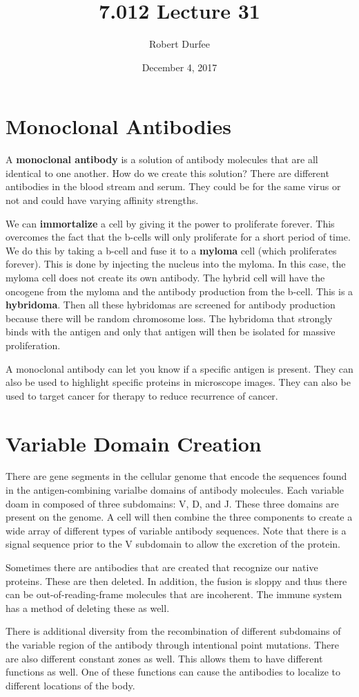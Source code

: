 \documentclass{article}
\title{ 7.012 Lecture 31 }
\author{ Robert Durfee }
\date{ December 4, 2017 }
\begin{document}
\maketitle

\section{ Monoclonal Antibodies }

A \textbf{monoclonal antibody} is a solution of antibody molecules that are all
identical to one another. How do we create this solution? There are different
antibodies in the blood stream and serum. They could be for the same virus or
not and could have varying affinity strengths.

We can \textbf{immortalize} a cell by giving it the power to proliferate
forever. This overcomes the fact that the b-cells will only proliferate for a
short period of time. We do this by taking a b-cell and fuse it to a
\textbf{myloma} cell (which proliferates forever). This is done by injecting the
nucleus into the myloma. In this case, the myloma cell does not create its own
antibody. The hybrid cell will have the oncogene from the myloma and the
antibody production from the b-cell. This is a \textbf{hybridoma}. Then all
these hybridomas are screened for antibody production because there will be
random chromosome loss. The hybridoma that strongly binds with the antigen and
only that antigen will then be isolated for massive proliferation.

A monoclonal antibody can let you know if a specific antigen is present. They
can also be used to highlight specific proteins in microscope images. They can
also be used to target cancer for therapy to reduce recurrence of cancer.

\section{ Variable Domain Creation }

There are gene segments in the cellular genome that encode the sequences found
in the antigen-combining varialbe domains of antibody molecules. Each variable
doam in composed of three subdomains: V, D, and J. These three domains are
present on the genome. A cell will then combine the three components to create a
wide array of different types of variable antibody sequences. Note that there is
a signal sequence prior to the V subdomain to allow the excretion of the
protein. 

Sometimes there are antibodies that are created that recognize our native
proteins. These are then deleted. In addition, the fusion is sloppy and thus
there can be out-of-reading-frame molecules that are incoherent. The immune
system has a method of deleting these as well. 

There is additional diversity from the recombination of different subdomains of
the variable region of the antibody through intentional point mutations. There
are also different constant zones as well. This allows them to have different
functions as well. One of these functions can cause the antibodies to localize
to different locations of the body.
\end{document}
